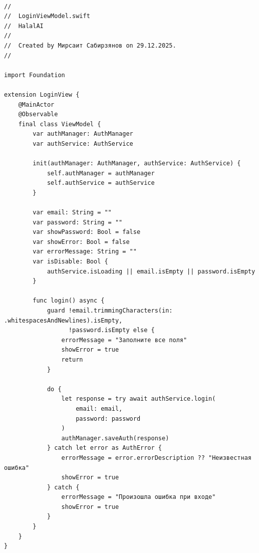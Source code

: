 \begin{lstlisting}[basicstyle=\tiny\ttfamily,breaklines=true]

//
//  LoginViewModel.swift
//  HalalAI
//
//  Created by Мирсаит Сабирзянов on 29.12.2025.
//

import Foundation

extension LoginView {
    @MainActor
    @Observable
    final class ViewModel {
        var authManager: AuthManager
        var authService: AuthService
        
        init(authManager: AuthManager, authService: AuthService) {
            self.authManager = authManager
            self.authService = authService
        }
        
        var email: String = ""
        var password: String = ""
        var showPassword: Bool = false
        var showError: Bool = false
        var errorMessage: String = ""
        var isDisable: Bool {
            authService.isLoading || email.isEmpty || password.isEmpty
        }
        
        func login() async {
            guard !email.trimmingCharacters(in: .whitespacesAndNewlines).isEmpty,
                  !password.isEmpty else {
                errorMessage = "Заполните все поля"
                showError = true
                return
            }
            
            do {
                let response = try await authService.login(
                    email: email,
                    password: password
                )
                authManager.saveAuth(response)
            } catch let error as AuthError {
                errorMessage = error.errorDescription ?? "Неизвестная ошибка"
                showError = true
            } catch {
                errorMessage = "Произошла ошибка при входе"
                showError = true
            }
        }
    }
}
\end{lstlisting}

